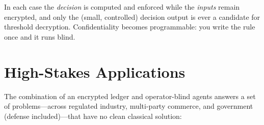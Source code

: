 \documentclass[11pt,letterpaper]{article}
\begin{document}
In each case the \emph{decision} is computed and enforced while the \emph{inputs}
remain encrypted, and only the (small, controlled) decision output is ever a
candidate for threshold decryption. Confidentiality becomes programmable: you write
the rule once and it runs blind.

\section{High-Stakes Applications}

The combination of an encrypted ledger and operator-blind agents answers a set of
problems---across regulated industry, multi-party commerce, and government
(defense included)---that have no clean classical solution:
\end{document}
